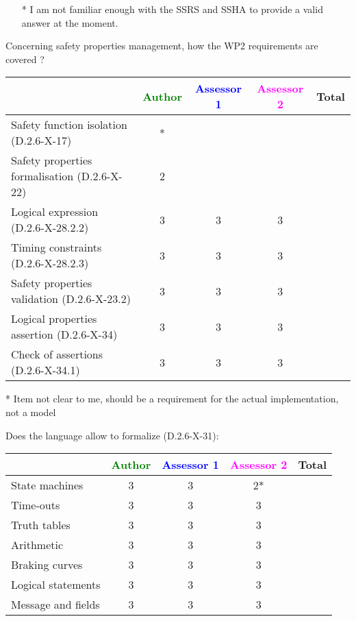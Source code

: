 \begin{assessor2}
  \begin{itemize}
  \item[*] I am not familiar enough with the SSRS and SSHA to provide a
    valid answer at the moment.
  \end{itemize}  
\end{assessor2}


Concerning safety properties management, how the WP2 requirements are covered ?

\begin{tabular}{|l | c | c | c | c|}
\hline
& \textcolor{green}{Author} & \textcolor{blue}{Assessor 1} & \textcolor{magenta}{Assessor 2} & Total \\
\hline
Safety function isolation (D.2.6-X-17) &* & & & \\
\hline
Safety properties formalisation (D.2.6-X-22) &2 & & & \\
\hline
Logical expression (D.2.6-X-28.2.2) &3 &3 &3 & \\
\hline
Timing constraints (D.2.6-X-28.2.3) &3 &3 &3 & \\
\hline
Safety properties validation (D.2.6-X-23.2) &3 &3 &3 & \\
\hline
Logical properties assertion (D.2.6-X-34) &3 &3 &3 & \\
\hline
Check of assertions (D.2.6-X-34.1) &3 &3 &3 & \\
\hline
\end{tabular}

\begin{author_comment}
* Item not clear to me, should be a requirement for the actual implementation, not a model
\end{author_comment}

Does the language allow to formalize (D.2.6-X-31):

\begin{tabular}{|l | c | c | c | c|}
\hline
& \textcolor{green}{Author} & \textcolor{blue}{Assessor 1} & \textcolor{magenta}{Assessor 2} & Total \\
\hline
State machines &3 &3 & 2* & \\
\hline
Time-outs &3 &3 &3 & \\
\hline
Truth tables &3 &3 &3 & \\
\hline
Arithmetic &3 &3 &3 & \\
\hline
Braking curves &3 &3 &3 & \\
\hline
Logical statements &3 &3 &3 & \\
\hline
Message and fields &3 &3 &3 & \\
\hline
\end{tabular}

